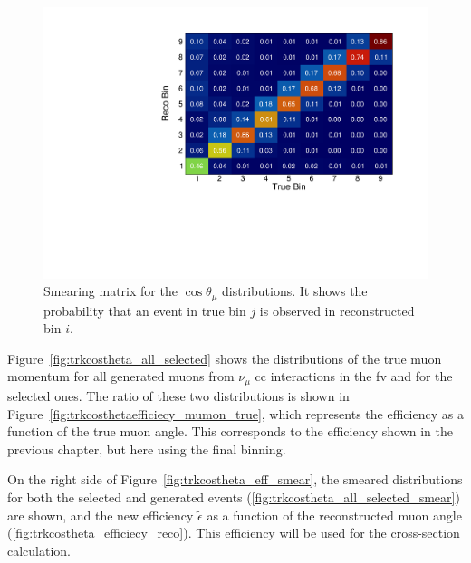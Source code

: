 \begin{figure}[]
\centering
\includegraphics[width=.80\textwidth]{images/XSecCosThetaMu/migration_matrix_2d}
\caption[Smearing Matrix for the $\cos\theta_\mu$ Distributions]{Smearing matrix for the $\cos\theta_\mu$ distributions. It shows the probability that an event in true bin $j$ is observed in reconstructed bin $i$.}
\label{fig:trkangle_migration_matrix_2d}
\end{figure}




Figure~\ref{fig:trkcostheta_all_selected} shows the distributions of the true muon momentum for all generated muons from $\nu_\mu$ \acrshort{cc} interactions in the \acrshort{fv} and for the selected ones. The ratio of these two distributions is shown in Figure~\ref{fig:trkcosthetaefficiecy_mumon_true}, which represents the efficiency as a function of the true muon angle. This corresponds to the efficiency shown in the previous chapter, but here using the final binning. 

On the right side of Figure~\ref{fig:trkcostheta_eff_smear}, the smeared distributions for both the selected and generated events (\ref{fig:trkcostheta_all_selected_smear}) are shown, and the new efficiency $\tilde{\epsilon}$ as a function of the reconstructed muon angle (\ref{fig:trkcostheta_efficiecy_reco}). This efficiency will be used for the cross-section calculation.


